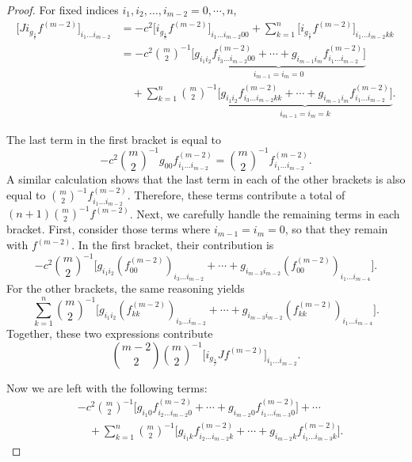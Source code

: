 \documentclass[11pt,a4paper,reqno]{amsart}
\newcommand{\gc}{i_{g_{\frac{1}{c}}}}
\begin{document}
	\begin{proof}
		 For fixed indices $i_1,i_2,\dots,i_{m-2} = 0,\cdots,n$,
		\begin{equation*}
			\begin{aligned}
				\Big[J\gc f^{(m-2)} \Big]_{i_1\dots i_{m-2}}&=-c^2\Big[\gc f^{(m-2)} \Big]_{i_1\dots i_{m-2}00}+\sum_{k=1}^n\Big[\gc f^{(m-2)} \Big]_{i_1\dots i_{m-2}kk}\\
				&=-c^2\binom{m}{2}^{-1}\underbrace{\Big[g_{i_1i_2}f^{(m-2)}_{i_3\dots i_{m-2}00}+\cdots +g_{i_{m-1}i_m}f^{(m-2)}_{i_1\dots i_{m-2}} \Big]}_{i_{m-1}=i_m=0}\\
				&\quad+\sum_{k=1}^{n}\binom{m}{2}^{-1}\underbrace{\Big[g_{i_1i_2}f^{(m-2)}_{i_3\dots i_{m-2}kk}+\cdots +g_{i_{m-1}i_m}f^{(m-2)}_{i_1\dots i_{m-2}} \Big]}_{i_{m-1}=i_m=k}.
			\end{aligned}
		\end{equation*}
		
The last term in the first bracket is equal to 
\[
-c^2 \binom{m}{2}^{-1} g_{00} f^{(m-2)}_{i_1 \dots i_{m-2}}
= \binom{m}{2}^{-1} f^{(m-2)}_{i_1 \dots i_{m-2}}.
\]
A similar calculation shows that the last term in each of the other brackets is also equal to 
		\(\binom{m}{2}^{-1} f^{(m-2)}_{i_1 \dots i_{m-2}}\). 
		Therefore, these terms contribute a total of 
		\((n+1)\binom{m}{2}^{-1} f^{(m-2)}\).
		Next, we carefully handle the remaining terms in each bracket.  
		First, consider those terms where \(i_{m-1} = i_m = 0\), so that they remain with \(f^{(m-2)}\). 
		In the first bracket, their contribution is 
		\[
		-c^2 \binom{m}{2}^{-1} \Big[
		g_{i_1 i_2}(f^{(m-2)}_{00})_{i_3 \dots i_{m-2}} 
		+ \cdots 
		+ g_{i_{m-3} i_{m-2}}(f^{(m-2)}_{00})_{i_1 \dots i_{m-4}}
		\Big].
		\]
		For the other brackets, the same reasoning yields 
		\[
		\sum_{k=1}^{n} \binom{m}{2}^{-1} \Big[
		g_{i_1 i_2}(f^{(m-2)}_{kk})_{i_3 \dots i_{m-2}} 
		+ \cdots 
		+ g_{i_{m-3} i_{m-2}}(f^{(m-2)}_{kk})_{i_1 \dots i_{m-4}}
		\Big].
		\]
		Together, these two expressions contribute 
		\[
		\binom{m-2}{2} \binom{m}{2}^{-1} 
		\big[ \gc J f^{(m-2)} \big]_{i_1 \dots i_{m-2}}.
		\]
		
		Now we are left with the following terms:
		\[
		\begin{aligned}
			&-c^2 \binom{m}{2}^{-1} 
			\Big[ g_{i_1 0} f^{(m-2)}_{i_2 \dots i_{m-2} 0} 
			+ \cdots 
			+ g_{i_{m-2} 0} f^{(m-2)}_{i_1 \dots i_{m-3} 0} \Big] 
			+ \cdots \\ 
			&\quad + \sum_{k=1}^{n} \binom{m}{2}^{-1} 
			\Big[ g_{i_1 k} f^{(m-2)}_{i_2 \dots i_{m-2} k} 
			+ \cdots 
			+ g_{i_{m-2} k} f^{(m-2)}_{i_1 \dots i_{m-3} k} \Big].
		\end{aligned}
		\]
		

\end{proof}
\end{document}
